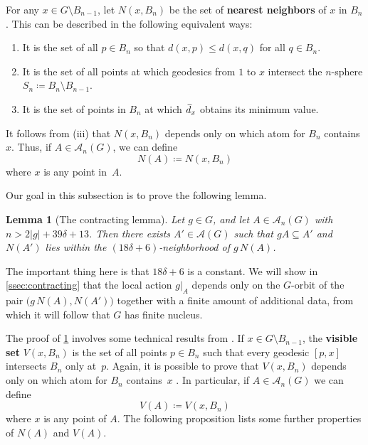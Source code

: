 \documentclass[11pt,letterpaper]{amsart}
\newtheorem{lemma}[theorem]{Lemma}
\theoremstyle{definition}
\newcommand{\newword}[1]{\textbf{#1}}
\newcommand{\A}{\mathcal{A}}
\newcommand{\od}{\mkern 3mu\overline{\mkern-3mu d\mkern 1.5mu}\mkern-1.5mu}
\begin{document}
For any $x\in G\setminus B_{n-1}$, let $N(x,B_n)$ be the set of \newword{nearest neighbors} of $x$ in $B_n$.  This can be described in the following equivalent ways:
\begin{enumerate}
    \item It is the set of all $p\in B_n$ so that $d(x,p)\leq d(x,q)$ for all $q\in B_n$.\smallskip
    \item It is the set of all points at which geodesics from $1$ to $x$ intersect the $n$-sphere $S_n\coloneqq B_n\setminus B_{n-1}$.
    \smallskip
    \item It is the set of points in $B_n$ at which $\od_x$ obtains its minimum value.
\end{enumerate}
It follows from (iii) that $N(x,B_n)$ depends only on which atom for $B_n$ contains $x$. Thus, if $A\in\A_n(G)$, we can define
\[
N(A) \coloneqq N(x,B_n)
\]
where $x$ is any point in~$A$.

Our goal in this subsection is to prove the following lemma.

\begin{lemma}[The contracting lemma]\label{lem:contractinglemma}
Let $g\in G$, and let $A\in \A_n(G)$ with $n >  2|g|+39\delta+13$.  Then there exists $A'\in\A(G)$ such that $gA\subseteq A'$ and $N(A')$ lies within the $(18\delta+6)$-neighborhood of $g\,N(A)$.
\end{lemma}

The important thing here is that $18\delta+6$ is a constant.  We will show in \cref{ssec:contracting} that the local action $g|_A$ depends only on the $G$-orbit of the pair $\bigl(g\,N(A),N(A')\bigr)$
together with a finite amount of additional data, from which it will follow that $G$ has finite nucleus.

The proof of \cref{lem:contractinglemma} involves some technical results from \cite{BelkBleakMatucci}.  If $x\in G\setminus B_{n-1}$, the \newword{visible set} $V(x,B_n)$ is the set of all points $p\in B_n$ such that every geodesic $[p,x]$ intersects $B_n$ only at~$p$.  Again, it is possible to prove that $V(x,B_n)$ depends only on which atom for $B_n$ contains~$x$ \cite[Proposition~2.15]{BelkBleakMatucci}.  In particular, if $A\in\A_n(G)$ we can define
\[
V(A) \coloneqq V(x,B_n)
\]
where $x$ is any point of $A$.  The following proposition lists some further properties of $N(A)$ and $V(A)$.
\end{document}
